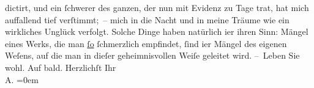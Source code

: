 \begin{ledgroupsized}[t]{13cm}
               dictirt, und ein ſchwerer \label{K_L01252-1v}\label{K_L01252-1h} des ganzen, der nun mit Evidenz zu Tage trat, hat mich auffallend tief
               verſtimmt; – mich in die Nacht und in meine Träume wie ein wirkliches Unglück ver{\pb}folgt. Solche Dinge haben natürlich i{\geminationm}er ihren Sinn: Mängel eines Werks, die man \uline{ſo}{ }ſchmerzlich empfindet, ſind i{\geminationm}er Mängel des eigenen Weſens, auf die man in dieſer
               geheimnisvollen Weiſe geleitet wird.\pend
           \pstart
           – Leben Sie wohl. Auf bald.\pend
           \pstart
           Herzlichſt Ihr{\\[\baselineskip]}\spacefill\mbox{A.}\pend
           \leftskip=0em{}
         
         \endnumbering{}\end{ledgroupsized}  \newcommand{\dateiname}{L01252}\newcommand{\titel}{Arthur Schnitzler an Hugo von Hofmannsthal, [25.? 11. 1902]}\newcommand{\editorInnen}{Martin Anton Müller und Gerd-Hermann Susen}
      